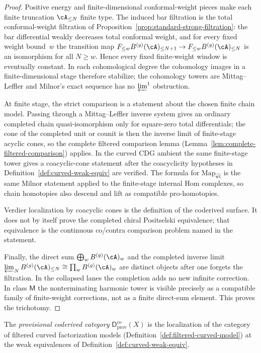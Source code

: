 \begin{proof}
Positive energy and finite-dimensional conformal-weight pieces make
each finite truncation $\cA_{\leq N}$ finite type. The induced bar
filtration is the total conformal-weight filtration of
Proposition~\ref{prop:standard-strong-filtration}: the bar
differential weakly decreases total conformal weight, and for every
fixed weight bound~$w$ the transition map
$F_{\leq w}B^{(g)}(\cA)_{\leq N+1}\to
F_{\leq w}B^{(g)}(\cA)_{\leq N}$
is an isomorphism for all $N\geq w$. Hence every fixed finite-weight
window is eventually constant. In each cohomological degree the
cohomology images in a finite-dimensional stage therefore stabilize;
the cohomology towers are Mittag--Leffler and Milnor's exact sequence
has no $\varprojlim^1$ obstruction.

At finite stage, the strict comparison is a statement about the chosen
finite chain model. Passing through a Mittag--Leffler inverse system
gives an ordinary completed chain quasi-isomorphism only for
square-zero total differentials; the cone of the completed unit or
counit is then the inverse limit of finite-stage acyclic cones, so the
complete filtered comparison lemma
\textup{(}Lemma~\ref{lem:complete-filtered-comparison}\textup{)}
applies. In the curved CDG ambient the same finite-stage tower gives a
coacyclic-cone statement after the coacyclicity hypotheses in
Definition~\ref{def:curved-weak-equiv} are verified. The formula for
$\mathrm{Map}_{\widehat{\mathrm{wt}}}$ is the same Milnor statement
applied to the finite-stage internal Hom complexes, so chain
homotopies also descend and lift as compatible pro-homotopies.

Verdier localization by coacyclic cones is the definition of the
coderived surface. It does not by itself prove the completed
chiral Positselski equivalence; that equivalence is the continuous
co/contra comparison problem named in the statement.

Finally, the direct sum
$\bigoplus_w B^{(g)}(\cA)_w$ and the completed inverse limit
$\varprojlim_N B^{(g)}(\cA)_{\leq N}\cong
\prod_w B^{(g)}(\cA)_w$
are distinct objects after one forgets the filtration. In the
collapsed lanes the completion adds no new infinite correction. In
class $\mathsf{M}$ the nonterminating harmonic tower is visible
precisely as a compatible family of finite-weight corrections, not as
a finite direct-sum element. This proves the trichotomy.
\end{proof}

\begin{definition}
\label{def:provisional-coderived}
The \emph{provisional coderived category} $\mathsf{D}^{\mathrm{co}}_{\mathrm{prov}}(X)$
is the localization of the category of filtered curved factorization
models (Definition~\ref{def:filtered-curved-model}) at the weak
equivalences of Definition~\ref{def:curved-weak-equiv}.
\end{definition}

